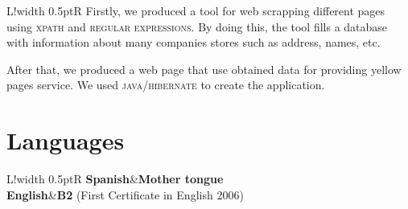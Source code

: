 \documentclass[10pt]{article}
\newcommand\VRule{\color{lightgray}\vrule width 0.5pt}
\begin{document}
\begin{tabular}{L!{\VRule}R}
Firstly, we produced a tool for web scrapping different pages using
\textsc{xpath} and \textsc{regular expressions}. By doing this, the tool fills a
database with information about many companies stores such as address, names, 
etc.

After that, we produced a web page that use obtained data for providing yellow 
pages service. We used \textsc{java/hibernate} to create the application. \\
\end{tabular}



\section*{Languages}

\begin{tabular}{L!{\VRule}R}
{\bf Spanish}&{\bf Mother tongue}\\
{\bf English}&{\bf B2} (First Certificate in English 2006)\\
\end{tabular}
\end{document}
